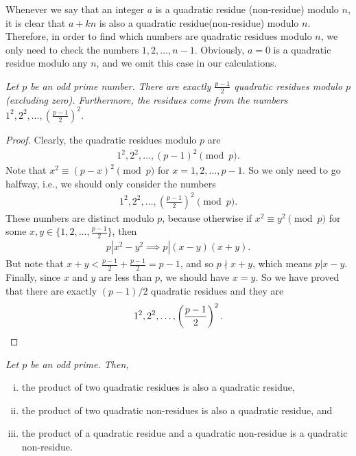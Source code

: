 \documentclass[12pt]{subfile}
\begin{document}
	\begin{note}
		Whenever we say that an integer $a$ is a quadratic residue (non-residue) modulo $n$, it is clear that $a+kn$ is also a quadratic residue(non-residue) modulo $n$. Therefore, in order to find which numbers are quadratic residues modulo $n$, we only need to check the numbers $1, 2, \ldots, n-1$. Obviously, $a=0$ is a quadratic residue modulo any $n$, and we omit this case in our calculations.
	\end{note}
	
	\begin{theorem}\slshape\label{thm:primeresidue}
		Let $p$ be an odd prime number. There are exactly $\displaystyle \frac{p-1}{2}$ quadratic residues modulo $p$ (excluding zero). Furthermore, the residues come from the numbers $1^2, 2^2, \ldots, \displaystyle \left(\frac{p-1}{2}\right)^2$.
	\end{theorem}
	
	\begin{proof}
		Clearly, the quadratic residues modulo $p$ are
		\begin{align*}
			1^2, 2^2, \ldots, (p-1)^2 \pmod p.
		\end{align*}
		Note that $x^2 \equiv (p-x)^2 \pmod p$ for $x=1,2,\ldots,p-1$. So we only need to go halfway, i.e., we should only consider the numbers
		\begin{align*}
			1^2, 2^2, \ldots, \displaystyle \left(\frac{p-1}{2}\right)^2 \pmod p.
		\end{align*}
		These numbers are distinct modulo $p$, because otherwise if $x^2 \equiv y^2 \pmod p$ for some $x,y \in \{1,2,\ldots,\frac{p-1}{2}\}$, then
		\begin{align*}
			p| x^2 -y^2 \implies p|(x-y)(x+y).
		\end{align*}
		But note that $x+y< \frac{p-1}{2}+\frac{p-1}{2}=p-1$, and so $p \nmid x+y$, which means $p|x-y$. Finally, since $x$ and $y$ are less than $p$, we should have $x=y$.
		So we have proved that there are exactly $(p-1)/2$ quadratic residues and they are
		\begin{equation*}
			1^2, 2^2, \ldots, \displaystyle \left(\frac{p-1}{2}\right)^2. 
			\qedhere
		\end{equation*}
	\end{proof}
	
	\begin{theorem}\slshape\label{thm:qrnr}
		Let $p$ be an odd prime. Then,
		\begin{enumerate}[(i)]
			\item the product of two quadratic residues is also a quadratic residue,
			\item the product of two quadratic non-residues is also a quadratic residue, and
			\item the product of a quadratic residue and a quadratic non-residue is a quadratic non-residue.
		\end{enumerate}
	\end{theorem}
	
\end{document}
